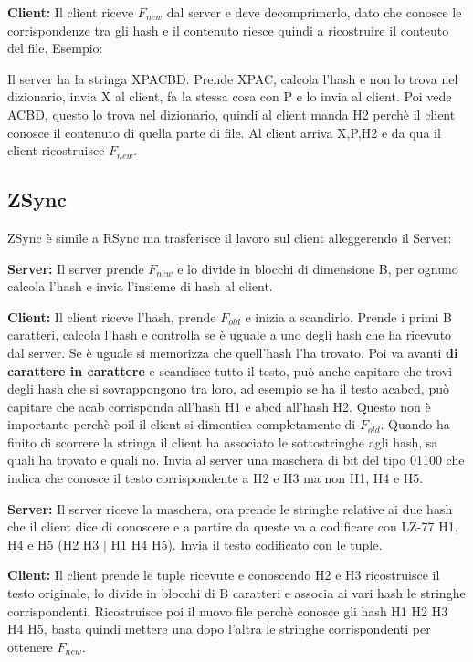 \documentclass[14pt]{extreport}
\begin{document}
{\bf Client:} Il client riceve $F_{new}$ dal server e deve decomprimerlo, dato che conosce le corrispondenze tra gli hash e il contenuto riesce quindi a ricostruire il conteuto del file.
\newline
\newline
Esempio:

Il server ha la stringa XPACBD. Prende XPAC, calcola l'hash e non lo trova nel dizionario, invia X al client, fa la stessa cosa con P e lo invia al client. Poi vede ACBD, questo lo trova nel dizionario, quindi al client manda H2 perchè il client conosce il contenuto di quella parte di file.
Al client arriva X,P,H2 e da qua il client ricostruisce $F_{new}$.
\newpage
\subsection{ZSync}

ZSync è simile a RSync ma trasferisce il lavoro sul client alleggerendo il Server:

{\bf Server:} Il server prende $F_{new}$ e lo divide in blocchi di dimensione B, per ognuno calcola l'hash e invia l'insieme di hash al client.

{\bf Client:} Il client riceve l'hash, prende $F_{old}$ e inizia a scandirlo. Prende i primi B caratteri, calcola l'hash e controlla se è uguale a uno degli hash che ha ricevuto dal server. Se è uguale si memorizza che quell'hash l'ha trovato. Poi va avanti {\bf di carattere in carattere} e scandisce tutto il testo, può anche capitare che trovi degli hash che si sovrappongono tra loro, ad esempio se ha il testo acabcd, può capitare che acab corrisponda all'hash H1 e abcd all'hash H2. Questo non è importante perchè poil il client si dimentica completamente di $F_{old}$.
Quando ha finito di scorrere la stringa il client ha associato le sottostringhe agli hash, sa quali ha trovato e quali no.
Invia al server una maschera di bit del tipo 01100 che indica che conosce il testo corrispondente a H2 e H3 ma non H1, H4 e H5.

{\bf Server:} Il server riceve la maschera, ora prende le stringhe relative ai due hash che il client dice di conoscere e a partire da queste va a codificare con LZ-77 H1, H4 e H5 (H2 H3 $|$ H1 H4 H5).
Invia il testo codificato con le tuple. 

{\bf Client:} Il client prende le tuple ricevute e conoscendo H2 e H3 ricostruisce il testo originale, lo divide in blocchi di B caratteri e associa ai vari hash le stringhe corrispondenti.
Ricostruisce poi il nuovo file perchè conosce gli hash H1 H2 H3 H4 H5, basta quindi mettere una dopo l'altra le stringhe corrispondenti per ottenere $F_{new}$.
\end{document}
